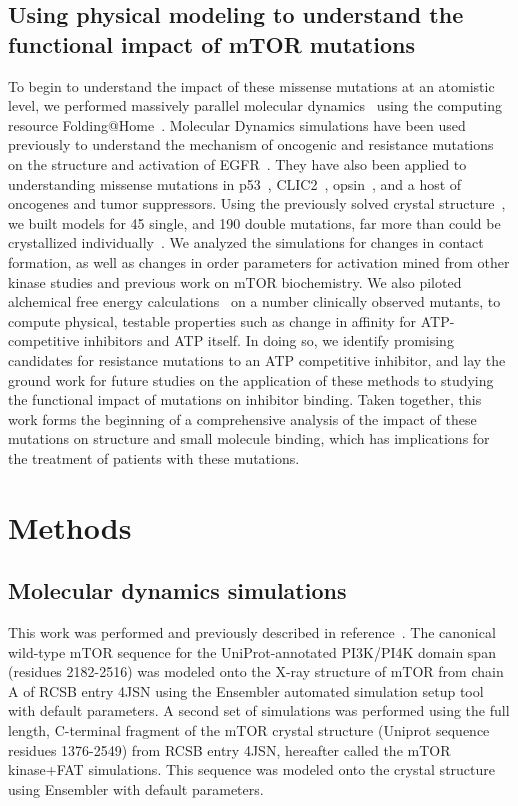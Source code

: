 \documentclass[phd,tocprelim]{cornell}
\begin{document}
\subsection{Using physical modeling to understand the functional impact of mTOR mutations}
To begin to understand the impact of these missense mutations at an atomistic level, we performed massively parallel molecular dynamics~\citep{Salsbury:2010ij} using the computing resource Folding@Home~\citep{Shirts:2000du}. Molecular Dynamics simulations have been used previously to understand the mechanism of oncogenic and resistance mutations on the structure and activation of EGFR~\citep{Shan:2012bs,Sutto:2013gy}. They have also been applied to understanding missense mutations in p53~\citep{Demir:2011bc}, CLIC2~\citep{Witham:2011co}, opsin~\citep{Tsukamoto:2013gr}, and a host of oncogenes and tumor suppressors\citep{Stehr:2011ga}. Using the previously solved crystal structure~\citep{Yang:2013gaa}, we built models for 45 single, and 190 double mutations, far more than could be crystallized individually~\citep{Xu:2016fw}. We analyzed the simulations for changes in contact formation, as well as changes in order parameters for activation mined from other kinase studies and previous work on mTOR biochemistry. We also piloted alchemical free energy calculations~\citep{Chodera:Curr.Opin.Struct.Biol.:2011} on a number clinically observed mutants, to compute physical, testable properties such as change in affinity for ATP-competitive inhibitors and ATP itself. In doing so, we identify promising candidates for resistance mutations to an ATP competitive inhibitor, and lay the ground work for future studies on the application of these methods to studying the functional impact of mutations on inhibitor binding. Taken together, this work forms the beginning of a comprehensive analysis of the impact of these mutations on structure and small molecule binding, which has implications for the treatment of patients with these mutations. 


\section{Methods}
\subsection{Molecular dynamics simulations}
This work was performed and previously described in reference~\cite{Xu:2016fw}. The canonical wild-type mTOR sequence for the UniProt-annotated PI3K/PI4K domain span (residues 2182-2516) was modeled onto the X-ray structure of mTOR from chain A of
RCSB entry 4JSN using the Ensembler automated simulation setup tool~\citep{Parton:2016cc} with default parameters. A second set of simulations was performed using the full length, C-terminal fragment of the mTOR crystal structure (Uniprot sequence residues 1376-2549) from RCSB entry 4JSN, hereafter called the mTOR kinase+FAT simulations. This sequence was modeled onto the crystal structure using Ensembler with default parameters. 
\end{document}

